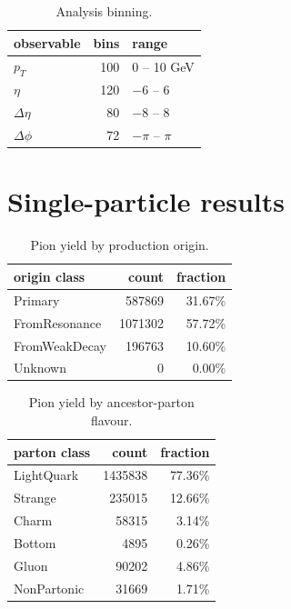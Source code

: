 \documentclass{article}
\begin{document}
\begin{table}[htbp]
\centering
\begin{tabular}{l r l}
\hline
observable & bins & range \\
\hline\hline
$p_{T}$ & 100 & 0 -- 10 GeV \\
$\eta$ & 120 & $-6$ -- $6$ \\
$\Delta\eta$ & 80 & $-8$ -- $8$ \\
$\Delta\phi$ & 72 & $-\pi$ -- $\pi$ \\
\hline
\end{tabular}
\caption{Analysis binning.}
\label{tab:binning}
\end{table}




\section{Single-particle results}


\begin{table}[htbp]
\centering
\begin{tabular}{l r r}
\hline
origin class & count & fraction \\
\hline\hline
Primary & 587869 & 31.67\% \\
FromResonance & 1071302 & 57.72\% \\
FromWeakDecay & 196763 & 10.60\% \\
Unknown & 0 & 0.00\% \\
\hline
\end{tabular}
\caption{Pion yield by production origin.}
\label{tab:origin}
\end{table}


\begin{table}[htbp]
\centering
\begin{tabular}{l r r}
\hline
parton class & count & fraction \\
\hline\hline
LightQuark & 1435838 & 77.36\% \\
Strange & 235015 & 12.66\% \\
Charm & 58315 & 3.14\% \\
Bottom & 4895 & 0.26\% \\
Gluon & 90202 & 4.86\% \\
NonPartonic & 31669 & 1.71\% \\
\hline
\end{tabular}
\caption{Pion yield by ancestor-parton flavour.}
\label{tab:parton}
\end{table}
\end{document}
